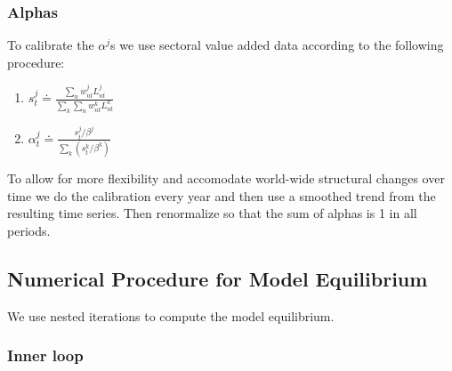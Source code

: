 \documentclass[12pt]{article}
\begin{document}
\subsubsection{Alphas}

To calibrate the $\alpha^{j}$s we use sectoral value added data according to
the following procedure:

\begin{enumerate}
\item $s^j_{t} \doteq \frac{\sum_n w^j_{nt} L^j_{nt}}{\sum_k \sum_n w^k_{nt}
L^k_{nt}}$

\item $\alpha^j_t \doteq \frac{s^j_{t} / \beta^j}{\sum_k (s^k_{t} / \beta^k)}
$
\end{enumerate}

To allow for more flexibility and accomodate world-wide structural changes
over time we do the calibration every year and then use a smoothed trend
from the resulting time series. Then renormalize so that the sum of alphas
is 1 in all periods.

\subsection{Numerical Procedure for Model Equilibrium}

We use nested iterations to compute the model equilibrium.

\subsubsection{Inner loop}
\end{document}
